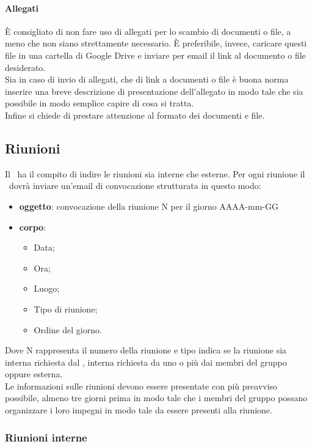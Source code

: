 \documentclass[../NormeProgetto.tex]{subfiles}
\begin{document}
		\paragraph{Allegati}
		È consigliato di non fare uso di allegati per lo scambio di documenti o file, a meno che non siano strettamente necessario. È preferibile, invece, caricare questi file in una cartella di Google Drive e inviare per email il link al documento o file desiderato. \\ Sia in caso di invio di allegati, che di link a documenti o file è buona norma inserire una breve descrizione di presentazione dell'allegato in modo tale che sia possibile in modo semplice capire di cosa si tratta. \\ Infine si chiede di prestare attenzione al formato dei documenti e file.
	\subsection{Riunioni}
		Il \responsabilediprogetto\ ha il compito di indire le riunioni sia interne che esterne. Per ogni riunione il \responsabilediprogetto\ dovrà inviare un'email di convocazione strutturata in questo modo:
		\begin{itemize}
		\item \textbf{oggetto}: convocazione della riunione N per il giorno AAAA-mm-GG
		\item \textbf{corpo}: 
		\begin{itemize}
		\item Data;
		\item Ora;
		\item Luogo;
		\item Tipo di riunione;
		\item Ordine del giorno.
		\end{itemize}
		\end{itemize}
		Dove N rappresenta il numero della riunione e tipo indica se la riunione sia interna richiesta dal \responsabilediprogetto, interna richiesta da uno o più dai membri del gruppo oppure esterna. \\
		Le informazioni sulle riunioni devono essere presentate con più preavviso possibile, almeno tre giorni prima in modo tale che i membri del gruppo possano organizzare i loro impegni in modo tale da essere presenti alla riunione.
		\subsubsection{Riunioni interne}
\end{document}
